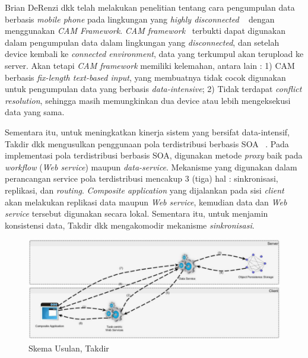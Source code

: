 Brian DeRenzi dkk telah melakukan penelitian tentang cara pengumpulan data berbasis \textit{mobile phone} pada lingkungan yang \textit{highly disconnected} ~\cite{derenzi_reliable_2007} dengan menggunakan \textit{CAM Framework}. \textit{CAM framework}~\cite{parikh_designing_2006} terbukti dapat digunakan dalam pengumpulan data dalam lingkungan yang \textit{disconnected}, dan setelah device kembali ke \textit{connected environment}, data yang terkumpul akan terupload ke server. Akan tetapi \textit{CAM framework} memiliki kelemahan, antara lain : 1) CAM berbasis \textit{fix-length text-based input}, yang membuatnya tidak cocok digunakan untuk pengumpulan data yang berbasis \textit{data-intensive}; 2) Tidak terdapat \textit{conflict resolution}, sehingga masih memungkinkan dua device atau lebih mengeksekusi data yang sama.

Sementara itu, untuk meningkatkan kinerja sistem yang bersifat data-intensif, Takdir dkk mengusulkan penggunaan pola terdistribusi berbasis SOA ~\cite{takdir_multi-layer_2014}. Pada implementasi pola terdistribusi berbasis SOA, digunakan metode \textit{proxy} baik pada \textit{workflow} (\textit{Web service}) maupun \textit{data-service}. Mekanisme yang digunakan dalam perancangan service pola terdistribusi mencakup 3 (tiga) hal : sinkronisasi, replikasi, dan \textit{routing}. \textit{Composite application} yang dijalankan pada sisi \textit{client} akan melakukan replikasi data maupun \textit{Web service}, kemudian data dan \textit{Web service} tersebut digunakan secara lokal. Sementara itu, untuk menjamin konsistensi data, Takdir dkk mengakomodir mekanisme \textit{sinkronisasi}.

\begin{figure}[h]
    \centering
    \includegraphics[width=13cm]{../../Resources/Images/takdir-distributed-soa}
    \caption{Skema Usulan, Takdir}
    \label{fig:takdir-soa}
\end{figure}

